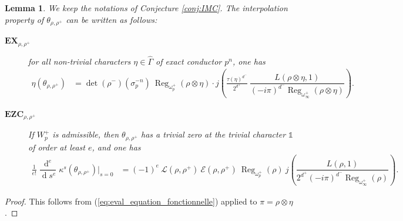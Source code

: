 \documentclass[12pt]{amsart}
\newcommand\cE{\mathcal{E}}
\newcommand\cL{\mathcal{L}}
\DeclareMathOperator{\Reg}{Reg}
\DeclareMathOperator{\diff}{d}
\theoremstyle{defstyle}
\theoremstyle{thmstyle}
\newtheorem{lemme}[subsubsection]{Lemma}
\begin{document}
\begin{lemme}\label{lem:formule_interpolation_en_s=1}
	We keep the notations of Conjecture \ref{conj:IMC}. The interpolation property of $\theta_{\rho,\rho^+}$ can be written as follows:
	\begin{description}
	\item[$\textbf{EX}_{\rho,\rho^+}$] for all non-trivial characters $\eta\in\widehat{\Gamma}$ of exact conductor $p^{n}$, one has 
	$$\begin{aligned}
		\eta(\theta_{\rho,\rho^+})
		&=\det(\rho^-)(\sigma_p^{-n})\ {\Reg_{\omega_p^+}(\rho\otimes\eta)} \cdot j\left(\frac{\tau(\eta)^{d^-}}{2^{d^+}}\  \dfrac{L\left(\rho \otimes \eta,1\right)}{(-i\pi)^{d^-}\Reg_{\omega_\infty^+}(\rho\otimes\eta)}\right).
	\end{aligned}$$
	\item[$\textbf{EZC}_{\rho,\rho^+}$] If $W_p^+$ is admissible, then $\theta_{\rho,\rho^+}$ has a trivial zero at the trivial character $\mathds{1}$ of order at least $e$, and one has
	$$\begin{aligned}
		\frac{1}{e!} \dfrac{\diff^e}{\diff \!s^e}\kappa^s(\theta_{\rho,\rho^+})\bigg|_{s=0}
		&=(-1)^e\ \cL(\rho,\rho^+)\ \cE(\rho,\rho^+)\ \Reg_{\omega_p^+}(\rho)\  j\left(\dfrac{L\left(\rho,1\right)}{2^{d^+}(-i\pi)^{d^-}\Reg_{\omega_\infty^+}(\rho)}\right).
	\end{aligned}$$
\end{description}


\end{lemme}
\begin{proof}
This follows from (\ref{eq:eval_equation_fonctionnelle}) applied to $\pi=\rho\otimes\eta$.
\end{proof}
\end{document}
